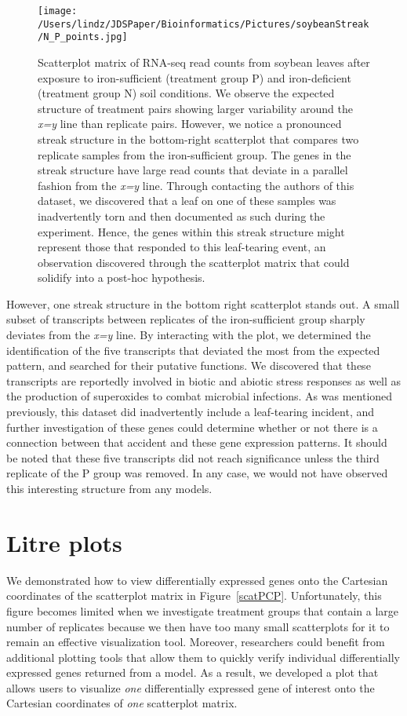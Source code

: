 \documentclass{bioinfo}
\begin{document}
\begin{figure}[!tpb]
\centerline{\texttt{[image: /Users/lindz/JDSPaper/Bioinformatics/Pictures/soybeanStreak/N\_P\_points.jpg]}}
\caption{Scatterplot matrix of RNA-seq read counts from soybean leaves after exposure to iron-sufficient (treatment group P) and iron-deficient (treatment group N) soil conditions. We observe the expected structure of treatment pairs showing larger variability around the \textit{x=y} line than replicate pairs. However, we notice a pronounced streak structure in the bottom-right scatterplot that compares two replicate samples from the iron-sufficient group. The genes in the streak structure have large read counts that deviate in a parallel fashion from the \textit{x=y} line. Through contacting the authors of this dataset, we discovered that a leaf on one of these samples was inadvertently torn and then documented as such during the experiment. Hence, the genes within this streak structure might represent those that responded to this leaf-tearing event, an observation discovered through the scatterplot matrix that could solidify into a post-hoc hypothesis.
\label{structure}}
\end{figure}

However, one streak structure in the bottom right scatterplot stands out. A small subset of transcripts between replicates of the iron-sufficient group sharply deviates from the \textit{x=y} line. By interacting with the plot, we determined the identification of the five transcripts that deviated the most from the expected pattern, and searched for their putative functions. We discovered that these transcripts are reportedly involved in biotic and abiotic stress responses as well as the production of superoxides to combat microbial infections. As was mentioned previously, this dataset did inadvertently include a leaf-tearing incident, and further investigation of these genes could determine whether or not there is a connection between that accident and these gene expression patterns. It should be noted that these five transcripts did not reach significance unless the third replicate of the P group was removed. In any case, we would not have observed this interesting structure from any models.

\section{Litre plots}

We demonstrated how to view differentially expressed genes onto the Cartesian coordinates of the scatterplot matrix in Figure~\ref{scatPCP}. Unfortunately, this figure becomes limited when we investigate treatment groups that contain a large number of replicates because we then have too many small scatterplots for it to remain an effective visualization tool. Moreover, researchers could benefit from additional plotting tools that allow them to quickly verify individual differentially expressed genes returned from a model. As a result, we developed a plot that allows users to visualize \textit{one} differentially expressed gene of interest onto the Cartesian coordinates of \textit{one} scatterplot matrix.
\end{document}
